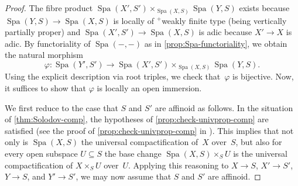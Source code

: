 \documentclass[a4paper,twoside,11pt,reqno]{amsart}
\DeclareMathOperator{\Spa}{Spa}
\theoremstyle{definition}
\numberwithin{equation}{subsection}
\begin{document}
\begin{proof}
    The fibre product $\Spa(X',S') \times_{\Spa(X,S)} \Spa(Y,S)$ exists because $\Spa(Y,S) \to \Spa(X,S)$ is locally of ${}^+$weakly finite type (being vertically partially proper) and $\Spa(X',S') \to \Spa(X,S)$ is adic because $X' \to X$ is adic.
    By functoriality of $\Spa(-,-)$ as in \cref{prop:Spa-functoriality}, we obtain the natural morphism
    \[
       \varphi \colon \Spa(Y',S') \longrightarrow \Spa(X',S') \times_{\Spa(X,S)} \Spa(Y,S).
    \]
    Using the explicit description via root triples, we check that~$\varphi$ is bijective.
    Now, it suffices to show that $\varphi$ is locally an open immersion.

    We first reduce to the case that $S$ and $S'$ are affinoid as follows. 
    In the situation of \cref{thm:Solodov-comp}, the hypotheses of \cref{prop:check-univprop-comp} 
    are satisfied (see the proof of \cref{prop:check-univprop-comp} in \cite[Theorem~3.29]{Solodov-vertical-compactification}).
    This implies that not only is $\Spa(X,S)$ the universal compactification of~$X$ over~$S$, but also for every open subspace $U \subseteq S$ the base change $\Spa(X,S) \times_S U$ is the universal compactification of $X \times_S U$ over~$U$.
    Applying this reasoning to $X \to S$, $X' \to S'$, $Y \to S$, and $Y' \to S'$, we may now assume that $S$ and $S'$ are affinoid. 


\end{proof}
\end{document}
